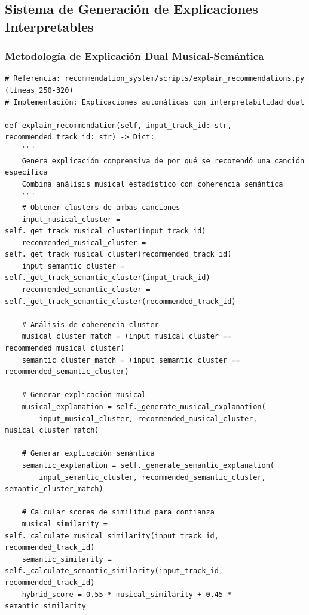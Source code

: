 \documentclass[12pt,a4paper]{report}
\begin{document}
\subsection{Sistema de Generación de Explicaciones Interpretables}

\subsubsection{Metodología de Explicación Dual Musical-Semántica}

\begin{lstlisting}[caption={Generación Automática de Explicaciones Comprensivas}]
# Referencia: recommendation_system/scripts/explain_recommendations.py (líneas 250-320)
# Implementación: Explicaciones automáticas con interpretabilidad dual

def explain_recommendation(self, input_track_id: str, recommended_track_id: str) -> Dict:
    """
    Genera explicación comprensiva de por qué se recomendó una canción específica
    Combina análisis musical estadístico con coherencia semántica
    """
    # Obtener clusters de ambas canciones
    input_musical_cluster = self._get_track_musical_cluster(input_track_id)
    recommended_musical_cluster = self._get_track_musical_cluster(recommended_track_id)
    input_semantic_cluster = self._get_track_semantic_cluster(input_track_id)
    recommended_semantic_cluster = self._get_track_semantic_cluster(recommended_track_id)

    # Análisis de coherencia cluster
    musical_cluster_match = (input_musical_cluster == recommended_musical_cluster)
    semantic_cluster_match = (input_semantic_cluster == recommended_semantic_cluster)

    # Generar explicación musical
    musical_explanation = self._generate_musical_explanation(
        input_musical_cluster, recommended_musical_cluster, musical_cluster_match)

    # Generar explicación semántica
    semantic_explanation = self._generate_semantic_explanation(
        input_semantic_cluster, recommended_semantic_cluster, semantic_cluster_match)

    # Calcular scores de similitud para confianza
    musical_similarity = self._calculate_musical_similarity(input_track_id, recommended_track_id)
    semantic_similarity = self._calculate_semantic_similarity(input_track_id, recommended_track_id)
    hybrid_score = 0.55 * musical_similarity + 0.45 * semantic_similarity


\end{lstlisting}
\end{document}
